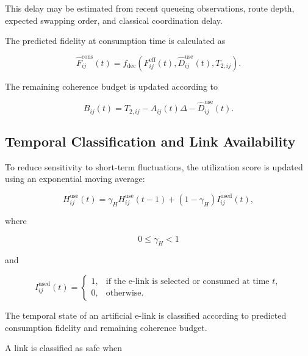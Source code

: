 This delay may be estimated from recent queueing observations, route depth, expected swapping order, and classical coordination delay.

The predicted fidelity at consumption time is calculated as

\begin{equation}
    \widehat{F}_{ij}^{\mathrm{cons}}(t)
    =
    f_{\mathrm{dec}}
    \left(
    F_{ij}^{\mathrm{eff}}(t),
    \widehat{D}_{ij}^{\mathrm{use}}(t),
    T_{2,ij}
    \right).
\end{equation}

The remaining coherence budget is updated according to

\begin{equation}
    B_{ij}(t)
    =
    T_{2,ij}
    -
    A_{ij}(t)\Delta
    -
    \widehat{D}_{ij}^{\mathrm{use}}(t).
\end{equation}

\subsection{Temporal Classification and Link Availability}

To reduce sensitivity to short-term fluctuations, the utilization score is updated using an exponential moving average:

\begin{equation}
    H_{ij}^{\mathrm{use}}(t)
    =
    \gamma_H
    H_{ij}^{\mathrm{use}}(t-1)
    +
    \left(
    1-\gamma_H
    \right)
    I_{ij}^{\mathrm{used}}(t),
\end{equation}

where

\begin{equation}
    0
    \leq
    \gamma_H
    <
    1
\end{equation}

and

\begin{equation}
    I_{ij}^{\mathrm{used}}(t)
    =
    \begin{cases}
        1, & \text{if the e-link is selected or consumed at time $t$},\\
        0, & \text{otherwise}.
    \end{cases}
\end{equation}

The temporal state of an artificial e-link is classified according to predicted consumption fidelity and remaining coherence budget.

A link is classified as safe when

